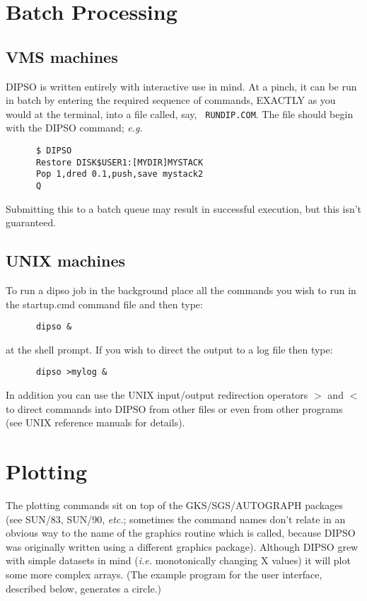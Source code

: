 \section {Batch Processing}

\subsection{VMS machines}

DIPSO is written entirely with interactive use in mind. At a pinch, it
can be run in batch by entering the required sequence of commands,
EXACTLY as you would at the terminal, into a file called, say, {\tt
RUNDIP.COM}. The file should begin with the DIPSO command; {\em e.g.}

\begin{verbatim}
      $ DIPSO
      Restore DISK$USER1:[MYDIR]MYSTACK
      Pop 1,dred 0.1,push,save mystack2
      Q
\end{verbatim}

Submitting this to a batch queue may result in successful execution,
but this isn't guaranteed.

\subsection{UNIX machines}

To run a dipso job in the background place all the commands you wish
to run in the startup.cmd command file and then type:

\begin{verbatim}
      dipso &
\end{verbatim}

at the shell prompt. If you wish to direct the output to a log file
then type:

\begin{verbatim}
      dipso >mylog &
\end{verbatim}

In addition you can use the UNIX input/output redirection operators
\(>\) and \(<\) to direct commands into DIPSO from other files or even 
from other programs (see UNIX reference manuals for details).

\section {Plotting}

The plotting commands sit on top of the GKS/SGS/AUTOGRAPH packages
(see SUN/83, SUN/90, {\em etc.}; sometimes the command names don't
relate in an obvious way to the name of the graphics routine which is
called, because DIPSO was originally written using a different
graphics package). Although DIPSO grew with simple datasets in mind
({\em i.e.} monotonically changing X values) it will plot some more
complex arrays. (The example program for the user interface, described
below, generates a circle.)

